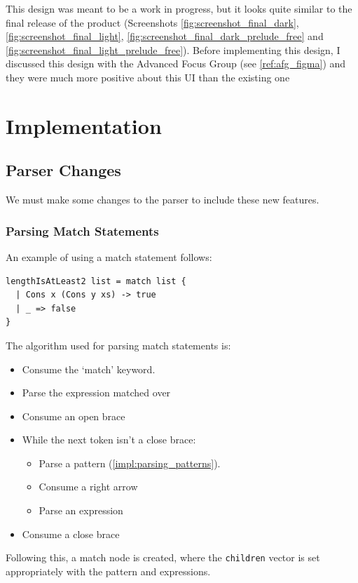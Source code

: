 This design was meant to be a work in progress, but it looks quite similar to the final release of the product (Screenshots \ref{fig:screenshot_final_dark}, \ref{fig:screenshot_final_light}, \ref{fig:screenshot_final_dark_prelude_free} and \ref{fig:screenshot_final_light_prelude_free}). Before implementing this design, I discussed this design with the Advanced Focus Group (see \ref{ref:afg_figma}) and they were much more positive about this UI than the existing one 
\\

\section{Implementation}
\subsection{Parser Changes}
We must make some changes to the parser to include these new features.

\subsubsection{Parsing Match Statements}
An example of using a match statement follows:
\begin{verbatim}
lengthIsAtLeast2 list = match list {
  | Cons x (Cons y xs) -> true
  | _ => false
}
\end{verbatim}

The algorithm used for parsing match statements is:
\begin{itemize}
    \item Consume the `match' keyword.
    \item Parse the expression matched over
    \item Consume an open brace
    \item While the next token isn't a close brace: \begin{itemize}
        \item Parse a pattern (\ref{impl:parsing_patterns}).
        \item Consume a right arrow
        \item Parse an expression
    \end{itemize}
    \item Consume a close brace
\end{itemize}
Following this, a match node is created, where the \verb|children| vector is set appropriately with the pattern and expressions.

